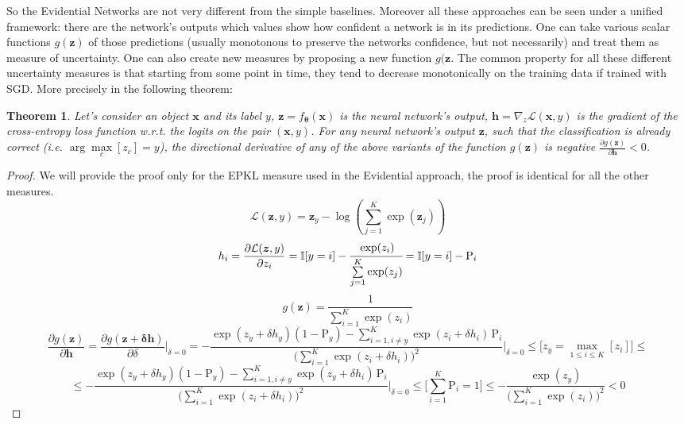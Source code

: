 \documentclass{article}
\newtheorem{theorem}{Theorem}
\begin{document}
So the Evidential Networks are not very different from the simple baselines.
Moreover all these approaches can be seen under a unified framework: there are the network's outputs which values show how confident a network is in its predictions.
One can take various scalar functions $g(\boldsymbol{z})$ of those predictions (usually monotonous to preserve the networks confidence, but not necessarily) and treat them as measure of uncertainty.
One can also create new measures by proposing a new function $g(\boldsymbol{z}$.
The common property for all these different uncertainty measures is that starting from some point in time, they tend to decrease monotonically on the training data if trained with SGD.
More precisely in the following theorem:
\begin{theorem}
Let's consider an object $\boldsymbol{x}$ and its label $y$, $\boldsymbol{z} = f_{\boldsymbol{\theta}}(\boldsymbol{x})$ is the neural network's output, $\boldsymbol{h} = \nabla_z \mathcal{L}(\boldsymbol{x}, y)$ is the gradient of the cross-entropy loss function w.r.t. the logits on the pair $(\boldsymbol{x}, y)$. For any neural network's output $\boldsymbol{z}$, such that the classification is already correct (i.e. $\arg\max\limits_c [z_c] = y$), the directional derivative of any of the above variants of the function $g(\boldsymbol{z})$ is negative $\frac{\partial g(\boldsymbol{z})}{\partial \boldsymbol{h}} < 0$.
\end{theorem}

\begin{proof}
We will provide the proof only for the EPKL measure used in the Evidential approach, the proof is identical for all the other measures.
$$\mathcal{L}(\boldsymbol{z}, y) = \boldsymbol{z}_y - \log(\sum\limits_{j=1}^K \exp(\boldsymbol{z}_j))$$
$$h_i = \frac{\partial \mathcal{L}(\boldsymbol{z}, y)}{\partial z_i} = \mathbb{I}[y = i] - \cfrac{\exp(z_i)}{\sum\limits_{j=1}^K \exp(z_j)} = \mathbb{I}[y = i] - \mathrm{P}_i$$
$$g(\boldsymbol{z}) = \frac{1}{\sum\limits_{i=1}^K \exp(z_i)}$$
$$\frac{\partial g(\boldsymbol{z})}{\partial \boldsymbol{h}} = \frac{\partial g(\boldsymbol{z + \delta h})}{\partial \delta} \Bigg|_{\delta = 0} = -\frac{\exp(z_y + \delta h_y) (1 - \mathrm{P}_y) - \sum\limits_{i=1, i \neq y}^K \exp(z_i + \delta h_i) \, \mathrm{P}_i}{ \Big( \sum\limits_{i=1}^K \exp(z_i + \delta h_i) \Big)^2} \Bigg|_{\delta = 0} \leq \Big[ z_y = \max\limits_{1 \leq i \leq K}[z_i] \Big] \leq$$
$$\leq -\frac{\exp(z_y + \delta h_y) (1 - \mathrm{P}_y) - \sum\limits_{i=1, i \neq y}^K \exp(z_y + \delta h_i) \, \mathrm{P}_i}{ \Big( \sum\limits_{i=1}^K \exp(z_i + \delta h_i) \Big)^2} \Bigg|_{\delta = 0} \leq \Bigg[ \sum\limits_{i=1}^K \mathrm{P}_i = 1 \Bigg] \leq -\frac{\exp(z_y)}{ \Big( \sum\limits_{i=1}^K \exp(z_i) \Big)^2} < 0$$
\end{proof}
\end{document}
